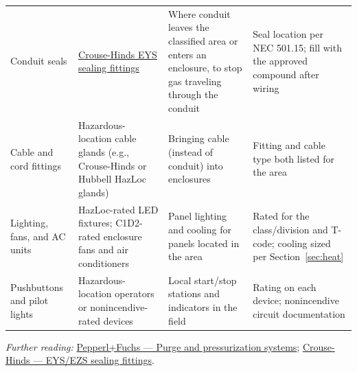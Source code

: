 \begin{small}
\begin{longtable}{@{}P{3.0cm}P{4.6cm}P{4.2cm}P{3.8cm}@{}}
Conduit seals & \href{https://www.eaton.com/content/dam/eaton/products/conduit-cable-and-wire-management/crouse-hinds/catalog-pages/crouse-hinds-eys-ezs-conduit-sealing-fittings-catalog-page.pdf}{Crouse-Hinds EYS sealing fittings} & Where conduit leaves the classified area or enters an enclosure, to stop gas traveling through the conduit & Seal location per NEC 501.15; fill with the approved compound after wiring \\
Cable and cord fittings & Hazardous-location cable glands (e.g., Crouse-Hinds or Hubbell HazLoc glands) & Bringing cable (instead of conduit) into enclosures & Fitting and cable type both listed for the area \\
Lighting, fans, and AC units & HazLoc-rated LED fixtures; C1D2-rated enclosure fans and air conditioners & Panel lighting and cooling for panels located in the area & Rated for the class/division and T-code; cooling sized per Section~\ref{sec:heat} \\
Pushbuttons and pilot lights & Hazardous-location operators or nonincendive-rated devices & Local start/stop stations and indicators in the field & Rating on each device; nonincendive circuit documentation \\
\bottomrule
\end{longtable}
\end{small}

\textit{Further reading:} \href{https://www.pepperl-fuchs.com/en-us/products/hazardous-area-products-and-solutions/purge-and-pressurization-systems-gp32661}{Pepperl+Fuchs --- Purge and pressurization systems}; \href{https://www.eaton.com/content/dam/eaton/products/conduit-cable-and-wire-management/crouse-hinds/catalog-pages/crouse-hinds-eys-ezs-conduit-sealing-fittings-catalog-page.pdf}{Crouse-Hinds --- EYS/EZS sealing fittings}.
